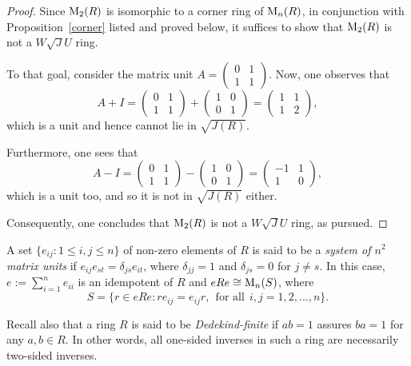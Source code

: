 \documentclass[12pt]{amsart}
\begin{document}
\begin{proof} Since \( {\rm M}_2(R) \) is isomorphic to a corner ring of \( {\rm M}_n(R) \), in conjunction with Proposition~\ref{corner} listed and proved below, it suffices to show that \( {\rm M}_2(R) \) is not a $W\sqrt{J}U$ ring.

To that goal, consider the matrix unit $A = \begin{pmatrix} 0 & 1 \\ 1 & 1 \end{pmatrix}$. Now, one observes that
\[ A + I =
\begin{pmatrix} 0 & 1 \\ 1 & 1 \end{pmatrix} + \begin{pmatrix} 1 & 0 \\ 0 & 1 \end{pmatrix} = \begin{pmatrix} 1
& 1 \\ 1 & 2 \end{pmatrix}, \] which is a unit and hence cannot lie in $\sqrt{J(R)}$.

Furthermore, one sees that \[ A - I = \begin{pmatrix} 0 & 1 \\ 1 & 1 \end{pmatrix} - \begin{pmatrix} 1 & 0 \\ 0 & 1
\end{pmatrix} = \begin{pmatrix} -1 & 1 \\ 1 & 0 \end{pmatrix}, \] which is a unit too, and so it is not in
$\sqrt{J(R)}$ either.

Consequently, one concludes that \( {\rm M}_2(R) \) is not a $W\sqrt{J}U$ ring, as pursued.
\end{proof}

A set $\{e_{ij} : 1 \le i, j \le n\}$ of non-zero elements of $R$ is said to be a {\it system of $n^2$ matrix units} if $e_{ij}e_{st} = \delta_{js}e_{it}$, where $\delta_{jj} = 1$ and $\delta_{js} = 0$ for $j \neq s$. In this case, $e := \sum_{i=1}^{n} e_{ii}$ is an idempotent of $R$ and $eRe \cong {\rm M}_n(S)$, where $$S = \{r \in eRe : re_{ij} = e_{ij}r,~~\textrm{for all}~~ i, j = 1, 2, . . . , n\}.$$

\noindent Recall also that a ring $R$ is said to be {\it Dedekind-finite} if $ab=1$ assures $ba=1$ for any $a,b\in R$. In other words, all one-sided inverses in such a ring are necessarily two-sided inverses.
\end{document}
